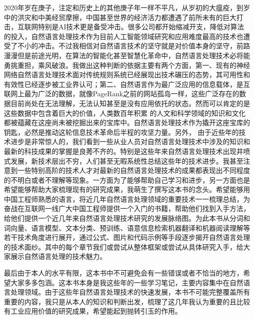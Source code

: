 \documentclass[twoside,a4paper,12pt]{book}%
\begin{document}
2020年岁在庚子，注定和历史上的其他庚子年一样不平凡，从岁初的大瘟疫，到岁中的洪灾和中美经贸摩擦，中国甚至世界的经济活力都遭遇了前所未有的巨大打击，互联网特别是AI技术更是备受冲击。很多公司都开始缩减开支，降低对算法的投入，自然语言处理技术作为目前人工智能领域研究和应用难度最高的技术也遭受了不小的冲击。不过我相信对自然语言技术的坚守就是对价值本身的坚守，前路漫漫但是前途光明，在算法的智能化甚至智慧化革命中，自然语言处理技术必将能勇挑重担，乘风破浪。我做出这种判断的依据主要有两个方面，第一、现有的神经网络自然语言处理技术面对传统规则系统已经展现出技术碾压的态势，其可用性和有效性已经逐步被工业界认可；第二、自然语言作为最广泛应用的信息载体，是互联网上最为广泛的数据，就像PageRank之前的网站孤岛一样，这些广泛存在的数据目前尚处在无法理解，无法认知甚至是没有应用依托的状态。然而可以肯定的是这些数据中包含着巨大的价值，人类数百年积累
的人文和科学领域的知识和文化都被蕴藏在这座尚未被挖掘出来的宝库中。自然语言处理技术作为撬开这座宝库的钥匙，必然是推动这轮信息技术革命后半程的攻坚力量。另外，
由于近些年的技术进步是非常惊人的，我们看到一些从业人员对自然语言处理技术中涉及的知识和最新的科技成果的掌握是良莠不齐的。特别是这些年来自然语言处理技术出现井喷式发展，新技术层出不穷，人们甚至无暇系统性总结这些年的技术进步。我甚至注意到一些特别高阶的技术人才对最新的自然语言处理技术的成果都表现出不同程度的不明白或者不理解等现象。一方面为了能够帮助自己学习和进步，另一方面也是希望能够帮助大家梳理现有的研究成果，我萌生了撰写这本书的念头。希望能够用中国工程师熟悉的语言，将近几年自然语言处理领域的重要技术一一梳理总结，为奋战在互联网一线广大中国工程师提供一个入门的书籍，帮助他们找到入手方法，给他们提供一个近几年来自然语言处理技术研究的发展脉络图。为此本书从分词和词向量、语言模型、文本分类、预训练、语意信息检索机器翻译和机器阅读理解等若干技术角度进行展开，通过公式、图片和代码示例等手段逐步揭开自然语言处理的技术面纱。其中的每个章节我们或尝试从整体框架或尝试从具体研究入手，给大家展示自然语言处理的技术魅力。

最后由于本人的水平有限，这本书中不可避免会有一些错误或者不恰当的地方，希望大家多多包涵。这本书本身是我这些年的一些学习笔记，主要内容集中在自然语言处理领域。由于这些年自然语言处理技术的快速发展，本书不可能完整覆盖所有重要的内容，我只是从本人的知识和判断出发，梳理了这几年我认为重要的且比较有工业应用价值的研究成果，希望能起到抛转引玉的作用。
\end{document}
